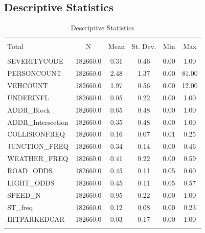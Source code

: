 \documentclass[a4paper,12pt]{article}
\begin{document}
\subsection{Descriptive Statistics}
\begin{table}[!htbp] \centering \scriptsize
  \caption{Descriptive Statistics}
  \label{tab1}
\begin{tabular}{@{\extracolsep{5pt}}lccccc}
\\[-1.8ex]\hline
\hline \\[-1.8ex]
Total & \multicolumn{1}{c}{N} & \multicolumn{1}{c}{Mean} & \multicolumn{1}{c}{St. Dev.} & \multicolumn{1}{c}{Min} & \multicolumn{1}{c}{Max} \\
\hline \\[-1.8ex]
SEVERITYCODE      &  182660.0 &  0.31 &  0.46 &  0.00 &   1.00 \\
PERSONCOUNT       &  182660.0 &  2.48 &  1.37 &  0.00 &  81.00 \\
VEHCOUNT          &  182660.0 &  1.97 &  0.56 &  0.00 &  12.00 \\
UNDERINFL         &  182660.0 &  0.05 &  0.22 &  0.00 &   1.00 \\
ADDR\_Block        &  182660.0 &  0.65 &  0.48 &  0.00 &   1.00 \\
ADDR\_Intersection &  182660.0 &  0.35 &  0.48 &  0.00 &   1.00 \\
COLLISIONFREQ     &  182660.0 &  0.16 &  0.07 &  0.01 &   0.25 \\
JUNCTION\_FREQ     &  182660.0 &  0.34 &  0.14 &  0.00 &   0.46 \\
WEATHER\_FREQ      &  182660.0 &  0.41 &  0.22 &  0.00 &   0.59 \\
ROAD\_ODDS         &  182660.0 &  0.45 &  0.11 &  0.05 &   0.60 \\
LIGHT\_ODDS        &  182660.0 &  0.45 &  0.11 &  0.05 &   0.57 \\
SPEED\_N           &  182660.0 &  0.95 &  0.22 &  0.00 &   1.00 \\
ST\_freq           &  182660.0 &  0.12 &  0.08 &  0.00 &   0.23 \\
HITPARKEDCAR      &  182660.0 &  0.03 &  0.17 &  0.00 &   1.00 \\
\hline \\[-1.8ex]
\end{tabular}

	\raggedright\footnotesize {}

\end{table}
\end{document}
